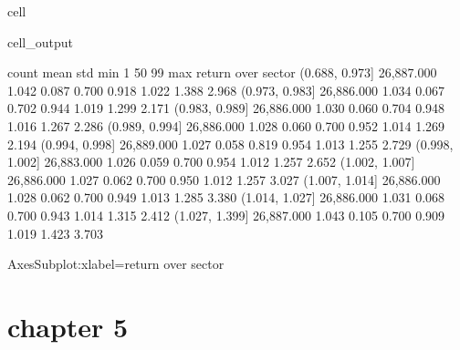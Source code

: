 \documentclass[letterpaper,10pt,english]{jupyterBook}
\begin{document}
\begin{sphinxuseclass}{cell}
\begin{sphinxVerbatimOutput}
\begin{sphinxuseclass}{cell_output}
\begin{sphinxVerbatim}[commandchars=\\\{\}]
                        count  mean   std   min    1\PYGZpc{}   50\PYGZpc{}   99\PYGZpc{}   max
return over sector                                                     
(0.688, 0.973]     26,887.000 1.042 0.087 0.700 0.918 1.022 1.388 2.968
(0.973, 0.983]     26,886.000 1.034 0.067 0.702 0.944 1.019 1.299 2.171
(0.983, 0.989]     26,886.000 1.030 0.060 0.704 0.948 1.016 1.267 2.286
(0.989, 0.994]     26,886.000 1.028 0.060 0.700 0.952 1.014 1.269 2.194
(0.994, 0.998]     26,889.000 1.027 0.058 0.819 0.954 1.013 1.255 2.729
(0.998, 1.002]     26,883.000 1.026 0.059 0.700 0.954 1.012 1.257 2.652
(1.002, 1.007]     26,886.000 1.027 0.062 0.700 0.950 1.012 1.257 3.027
(1.007, 1.014]     26,886.000 1.028 0.062 0.700 0.949 1.013 1.285 3.380
(1.014, 1.027]     26,886.000 1.031 0.068 0.700 0.943 1.014 1.315 2.412
(1.027, 1.399]     26,887.000 1.043 0.105 0.700 0.909 1.019 1.423 3.703
\end{sphinxVerbatim}

\begin{sphinxVerbatim}[commandchars=\\\{\}]
\PYGZlt{}AxesSubplot:xlabel=\PYGZsq{}return over sector\PYGZsq{}\PYGZgt{}
\end{sphinxVerbatim}

\noindent{}

\end{sphinxuseclass}\end{sphinxVerbatimOutput}

\end{sphinxuseclass}

\part{chapter 5}
\end{document}
